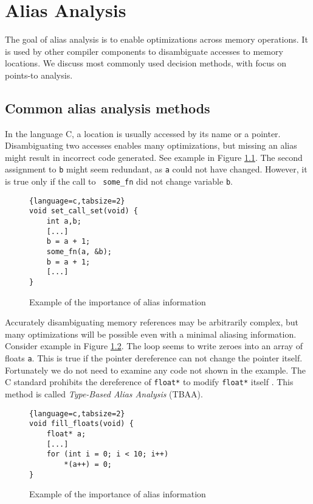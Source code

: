 \chapter{Alias Analysis}

The goal of alias analysis is to enable optimizations across memory operations.
It is used by other compiler components to disambiguate accesses to memory
locations. We discuss most commonly used decision methods, with focus on points-to
analysis.

\section{Common alias analysis methods}

In the language C, a location is usually accessed by its name or a
pointer. Disambiguating two accesses enables many optimizations, but missing an
alias might result in incorrect code generated. See example in Figure
\ref{alias-example1}. The second assignment to {\tt b} might seem redundant, as
{\tt a} could not have changed.  However, it is true only if the call to {\tt
some\_fn} did not change variable {\tt b}.

\begin{figure}[h!]
\label{alias-example1}
\begin{tcolorbox}
\begin{lstlisting}{language=c,tabsize=2}
void set_call_set(void) {
	int a,b;
	[...]
	b = a + 1;
	some_fn(a, &b);
	b = a + 1;
	[...]
}
\end{lstlisting}
\end{tcolorbox}
\caption{Example of the importance of alias information}
\end{figure}

Accurately disambiguating memory references may be arbitrarily complex, but many
optimizations will be possible even with a minimal aliasing information.
Consider example in Figure \ref{alias-example2}. The loop seems to write zeroes
into an array of floats {\tt a}. This is true if the pointer dereference can not
change the pointer itself. Fortunately we do not need to examine any code not
shown in the example. The C standard prohibits the dereference of {\tt float*}
to modify {\tt float*} itself \cite{isoc}. This method is called {\it Type-Based
Alias Analysis} (TBAA).

\begin{figure}[h!]
	\label{alias-example2}
\begin{tcolorbox}
\begin{lstlisting}{language=c,tabsize=2}
void fill_floats(void) {
	float* a;
	[...]
	for (int i = 0; i < 10; i++)
		*(a++) = 0;
}
\end{lstlisting}
\end{tcolorbox}
	\caption{Example of the importance of alias information}
\end{figure}

